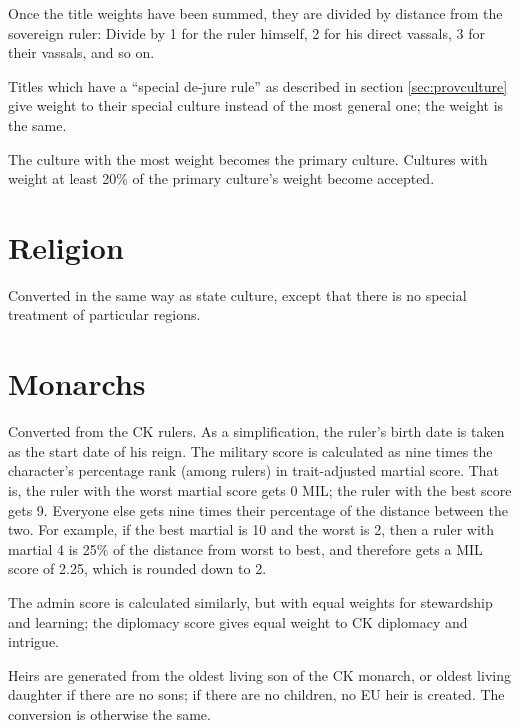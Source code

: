 \documentclass[12pt,ebook,oneside]{book}
\begin{document}
Once the title weights have been summed, they are divided by distance
from the sovereign ruler: Divide by 1 for the ruler himself, 2 for his
direct vassals, 3 for their vassals, and so on. 

Titles which have a ``special de-jure rule'' as described in section
\ref{sec:provculture} give weight to their special culture instead of
the most general one; the weight is the same. 

The culture with the most weight becomes the primary culture. 
Cultures with weight at least 20\% of the primary culture's weight
become accepted. 

\section{Religion}

Converted in the same way as state culture, except that there is no
special treatment of particular regions. 

\section{Monarchs}

Converted from the CK rulers. As a simplification, the ruler's birth
date is taken as the start date of his reign. The military score is
calculated as nine times the character's percentage rank (among
rulers) in trait-adjusted martial score. That is, the ruler with the
worst martial score gets 0 MIL; the ruler with the best score gets
9. Everyone else gets nine times their percentage of the distance
between the two. For example, if the best martial is 10 and the worst is
2, then a ruler with martial 4 is 25\% of the distance from worst to
best, and therefore gets a MIL score of 2.25, which is rounded down to
2. 

The admin score is calculated similarly, but with equal weights for
stewardship and learning; the diplomacy score gives equal weight to CK
diplomacy and intrigue. 

Heirs are generated from the oldest living son of the CK monarch, or
oldest living daughter if there are no sons; if there are no children,
no EU heir is created. The conversion is otherwise the same. 
\end{document}
